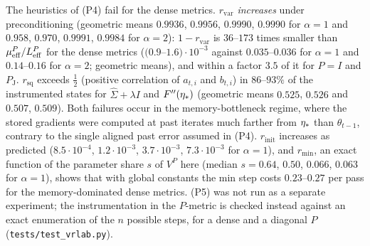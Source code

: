 The heuristics of (P4) fail for the dense metrics. $r_{\mathrm{var}}$ \emph{increases} under preconditioning
(geometric means $0.9936$, $0.9956$, $0.9990$, $0.9990$ for $\alpha=1$ and $0.958$, $0.970$, $0.9991$, $0.9984$
for $\alpha=2$): $1-r_{\mathrm{var}}$ is $36$--$173$ times smaller than $\mu_{\mathrm{eff}}^P/L_{\mathrm{eff}}^P$ for the dense metrics
($(0.9$--$1.6)\cdot10^{-3}$ against $0.035$--$0.036$ for $\alpha=1$ and $0.14$--$0.16$ for $\alpha=2$; geometric
means), and
within a factor $3.5$ of it for $P=I$ and $P_{\mathrm J}$. $r_{\mathrm{sq}}$ exceeds $\frac12$ (positive
correlation of $a_{t,i}$ and $b_{t,i}$) in $86$--$93\%$ of the instrumented states for $\hat\Sigma+\lambda I$ and
$F''(\eta_\ast)$ (geometric means $0.525$, $0.526$ and $0.507$, $0.509$). Both failures occur in the
memory-bottleneck regime, where the stored gradients were computed at past iterates much farther from
$\eta_\ast$ than $\theta_{t-1}$, contrary to the single aligned past error assumed in (P4). $r_{\mathrm{init}}$
increases as predicted ($8.5\cdot10^{-4}$, $1.2\cdot10^{-3}$, $3.7\cdot10^{-3}$, $7.3\cdot10^{-3}$ for $\alpha=1$),
and $r_{\mathrm{min}}$, an exact function of the parameter share $s$ of $V^P$ here (median $s=0.64$, $0.50$,
$0.066$, $0.063$ for $\alpha=1$), shows that with global constants the min step costs $0.23$--$0.27$ per pass for
the memory-dominated dense metrics. (P5) was not run as a separate experiment; the instrumentation in the
$P$-metric is checked instead against an exact enumeration of the $n$ possible steps, for a dense and a diagonal
$P$ (\texttt{tests/test\_vrlab.py}).

